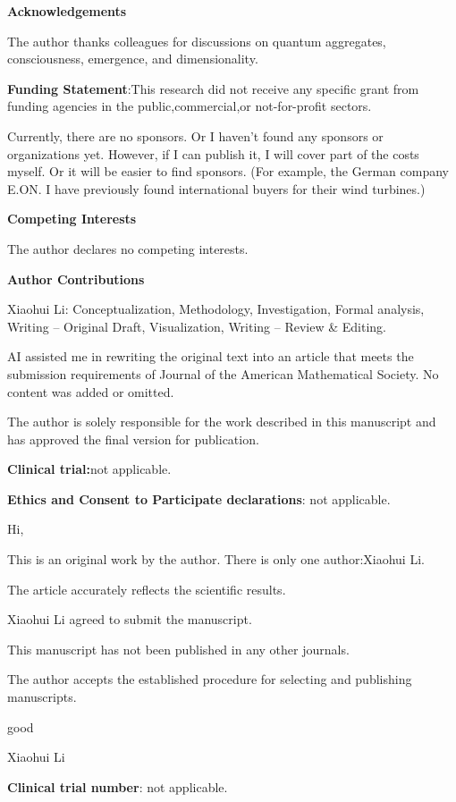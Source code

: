 \documentclass[11pt,a4paper]{article}
\begin{document}
  \textbf{\textbf{Acknowledgements}}

The author thanks colleagues for discussions on quantum aggregates, consciousness, emergence, and dimensionality. 

 \textbf{\textbf{Funding Statement}}:This research did not receive any specific grant from funding agencies in the public,commercial,or not-for-profit sectors.

Currently, there are no sponsors. Or I haven't found any sponsors or organizations yet. However, if I can publish it, I will cover part of the costs myself. Or it will be easier to find sponsors. (For example, the German company E.ON. I have previously found international buyers for their wind turbines.)

 \textbf{\textbf{Competing Interests}}

The author declares no competing interests.

 \textbf{\textbf{Author Contributions}}

Xiaohui Li: Conceptualization, Methodology, Investigation, Formal analysis, Writing – Original Draft, Visualization, Writing – Review \& Editing.

AI assisted me in rewriting the original text into an article that meets the submission requirements of Journal of the American Mathematical Society. No content was added or omitted.

 The author is solely responsible for the work described in this manuscript and has approved the final version for publication.

 \textbf{\textbf{Clinical trial:}}not applicable.

 \textbf{\textbf{Ethics and Consent to Participate declarations}}: not applicable.

 Hi,

This is an original work by the author. There is only one author:Xiaohui Li.

The article accurately reflects the scientific results.

Xiaohui Li agreed to submit the manuscript.

This manuscript has not been published in any other journals.

The author accepts the established procedure for selecting and publishing manuscripts.

good

Xiaohui Li



 \textbf{\textbf{Clinical trial number}}: not applicable.
\end{document}
